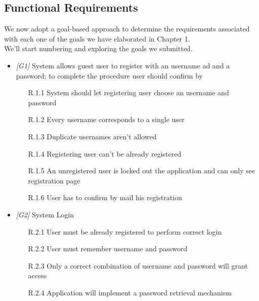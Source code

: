 
\subsection{Functional Requirements}

We now adopt a goal-based approach to determine the requirements associated with each one of the goals we have elaborated in Chapter 1.\\
We'll start numbering and exploring the goals we submitted.

\begin{itemize}

            \item \textit{[G1]} System allows guest user to register with an username ad and a password; to complete the procedure user should confirm by 
               
                  \begin{itemize}
                        \item [R.1.1] System should let registering user choose an username and password
                        \item [R.1.2] Every username corresponds to a single user
                        \item [R.1.3] Duplicate usernames aren’t allowed
                        \item [R.1.4] Registering user can't be already registered
                        \item [R.1.5] An unregistered user is locked out the application and can only see registration page
                        \item [R.1.6] User has to confirm by mail his registration
                  \end{itemize}
             
\item \textit{[G2]} System Login

                  \begin{itemize}
                        \item [R.2.1] User must be already registered to perform correct login
                        \item [R.2.2] User must remember username and password
                        \item [R.2.3] Only a correct combination of username and password will grant access
                        \item [R.2.4] Application will implement a password retrieval mechanism
                  \end{itemize}
                  

\end{itemize}
